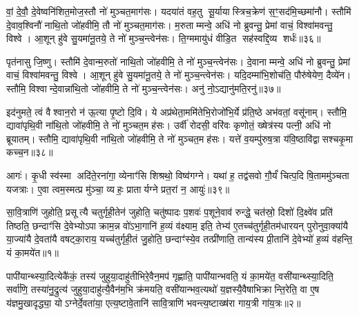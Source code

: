 वां॒ दे॒वौ॒ दे॒वेष्वनि॑शित॒मोज॒स्तौ नो॑ मुञ्चत॒माग॑सः। यदया॑तं वह॒तु सू॒र्यायास्त्रिच॒क्रेण॑ स॒ꣳ॒सद॑मि॒च्छमा॑नौ। स्तौमि॑ दे॒वाव॒श्विनौ॑ नाथि॒तो जो॑हवीमि॒ तौ नो॑ मुञ्चत॒माग॑सः। म॒रुताम्मन्वे॒ अधि॑ नो ब्रुवन्तु॒ प्रेमां वाचं॒ विश्वा॑मवन्तु॒ विश्वे। आ॒शून् हु॑वे सु॒यमा॑नू॒तये॒ ते नो॑ मुञ्च॒न्त्वेन॑सः। ति॒ग्ममायु॑धं वीडि॒त सह॑स्वद्दि॒व्य शर्धः॑॥३६॥

पृत॑नासु जि॒ष्णु। स्तौमि॑ दे॒वान्म॒रुतो॑ नाथि॒तो जो॑हवीमि॒ ते नो॑ मुञ्च॒न्त्वेन॑सः। दे॒वानाम्मन्वे॒ अधि॑ नो ब्रुवन्तु॒ प्रेमां वाचं॒ विश्वा॑मवन्तु॒ विश्वे। आ॒शून् हु॑वे सु॒यमा॑नू॒तये॒ ते नो॑ मुञ्च॒न्त्वेन॑सः। यदि॒दम्मा॑भि॒शोच॑ति॒ पौरु॑षेयेण॒ दैव्ये॑न। स्तौमि॒ विश्वान्दे॒वान्ना॑थि॒तो जो॑हवीमि॒ ते नो॑ मुञ्च॒न्त्वेन॑सः। अनु॑ नो॒ऽद्यानु॑मति॒रनु॑॥३७॥

इद॑नुमते॒ त्वं वैश्वान॒रो न॑ ऊ॒त्या पृ॒ष्टो दि॒वि। ये अप्र॑थेता॒ममि॑तेभि॒रोजो॑भि॒र्ये प्र॑ति॒ष्ठे अभ॑वतां॒ वसू॑नाम्। स्तौमि॒ द्यावा॑पृथि॒वी ना॑थि॒तो जो॑हवीमि॒ ते नो॑ मुञ्चत॒मह॑सः। उर्वी॑ रोदसी॒ वरि॑वः कृणोतं॒ ख्षेत्र॑स्य पत्नी॒ अधि॑ नो ब्रूयातम्। स्तौमि॒ द्यावा॑पृथि॒वी ना॑थि॒तो जो॑हवीमि॒ ते नो॑ मुञ्चत॒मह॑सः। यत्ते॑ व॒यम्पु॑रुष॒त्रा य॑वि॒ष्ठावि॑द्वासश्चकृ॒मा कच्च॒न॥३८॥

आगः॑। कृ॒धी स्व॑स्मा अदि॑ते॒रना॑गा॒ व्येनाꣳ॑सि शिश्रथो॒ विष्व॑गग्ने। यथा॑ ह॒ तद्व॑सवो गौ॒र्यं॑ चित्प॒दि षि॒ताममु॑ञ्चता यजत्राः। ए॒वा त्वम॒स्मत्प्र मु॑ञ्चा॒ व्यहः॒ प्रातार्यग्ने प्रत॒रां न॒ आयुः॑॥३९॥


{\anuvakamend[{गन्ता॑ दू॒षय॒न्थ्स्तौमि॒ ययो॒श्शर्धोऽनु॑मति॒रनु॑ च॒न चतु॑स्त्रिशच्च॥15॥}]}

{\anuvakamend[{अ॒ग्निष्ट्वा॑ वा॒मश्वो॒ द्विच॑त्वारिशच्च॥11॥}]}

\setcounter{anuvakam}{0}
सा॒वि॒त्राणि॑ जुहोति॒ प्रसूत्यै चतुर्गृही॒तेन॑ जुहोति॒ चतु॑ष्पादः प॒शवः॑ प॒शूने॒वाव॑ रुन्द्धे॒ चत॑स्रो॒ दिशो॑ दि॒क्ष्वे॑व प्रति॑ तिष्ठति॒ छन्दाꣳ॑सि दे॒वेभ्योऽपाक्राम॒न्न वो॑ऽभा॒गानि॑ ह॒व्यं व॑क्ष्याम॒ इति॒ तेभ्य॑ ए॒तच्च॑तुर्गृही॒तम॑धारयन् पुरोनुवा॒क्या॑यै या॒ज्या॑यै दे॒वता॑यै वषट्का॒राय॒ यच्च॑तुर्गृही॒तं जु॒होति॒ छन्दाꣳ॑स्ये॒व तत्प्री॑णाति॒ तान्य॑स्य प्री॒तानि॑ दे॒वेभ्यो॑ ह॒व्यं व॑हन्ति॒ यं का॒मये॑त॥१॥

पापी॑यान्थ्स्या॒दित्येकै॑कं॒ तस्य॑ जुहुया॒दाहु॑तीभिरे॒वैन॒मप॑ गृह्णाति॒ पापी॑यान्भवति॒ यं का॒मये॑त॒ वसी॑यान्थ्स्या॒दिति॒ सर्वा॑णि॒ तस्या॑नु॒द्रुत्य॑ जुहुया॒दाहु॑त्यै॒वैन॑म॒भि क्र॑मयति॒ वसी॑यान्भव॒त्यथो॑ य॒ज्ञस्यै॒वैषाभिक्रान्ति॒रेति॒ वा ए॒ष य॑ज्ञमु॒खादृद्ध्या॒ योऽग्नेर्दे॒वता॑या॒ एत्य॒ष्टावे॒तानि॑ सावि॒त्राणि॑ भवन्त्य॒ष्टाख्ष॑रा गाय॒त्री गा॑य॒त्रः॥२॥

